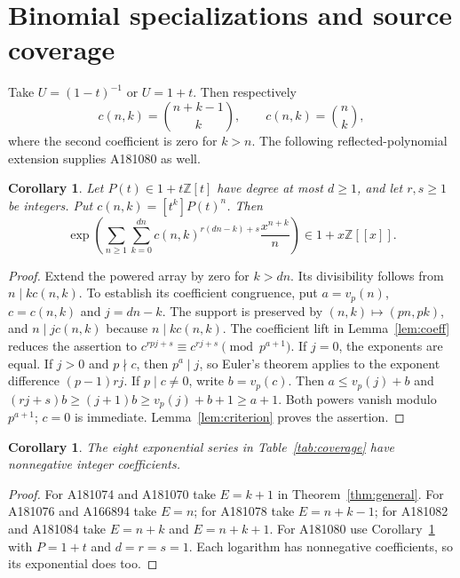 \documentclass[11pt]{article}
\newtheorem{corollary}[theorem]{Corollary}
\begin{document}
\section{Binomial specializations and source coverage}

Take \(U=(1-t)^{-1}\) or \(U=1+t\). Then respectively
\[
 c(n,k)=\binom{n+k-1}{k},\qquad c(n,k)=\binom nk,
\]
where the second coefficient is zero for \(k>n\).
The following reflected-polynomial extension supplies A181080 as well.

\begin{corollary}\label{cor:polynomial}
Let $P(t)\in1+t\mathbb Z[t]$ have degree at most $d\ge1$, and let
$r,s\ge1$ be integers. Put $c(n,k)=[t^k]P(t)^n$. Then
\[
 \exp\left(\sum_{n\ge1}\sum_{k=0}^{dn}
 c(n,k)^{r(dn-k)+s}\frac{x^{n+k}}n\right)\in1+x\mathbb Z[[x]].
\]
\end{corollary}
\begin{proof}
Extend the powered array by zero for $k>dn$. Its divisibility follows
from $n\mid kc(n,k)$. To establish its coefficient congruence, put
$a=v_p(n)$, $c=c(n,k)$ and $j=dn-k$. The support is preserved by $(n,k)\mapsto(pn,pk)$,
and $n\mid jc(n,k)$ because $n\mid kc(n,k)$.
The coefficient lift in Lemma~\ref{lem:coeff} reduces the assertion to
$c^{rpj+s}\equiv c^{rj+s}\pmod{p^{a+1}}$.
If $j=0$, the exponents are equal. If $j>0$ and $p\nmid c$,
then $p^a\mid j$, so Euler's theorem applies to the exponent difference
$(p-1)rj$. If $p\mid c\ne0$, write $b=v_p(c)$.
Then $a\le v_p(j)+b$ and
$(rj+s)b\ge(j+1)b\ge v_p(j)+b+1\ge a+1$.
Both powers vanish modulo $p^{a+1}$; $c=0$ is immediate.
Lemma~\ref{lem:criterion} proves the assertion.
\end{proof}

\begin{corollary}\label{cor:binomial}
The eight exponential series in Table~\ref{tab:coverage} have nonnegative
integer coefficients.
\end{corollary}
\begin{proof}
For A181074 and A181070 take $E=k+1$ in Theorem~\ref{thm:general}.
For A181076 and A166894 take $E=n$; for A181078 take $E=n+k-1$;
for A181082 and A181084 take $E=n+k$ and $E=n+k+1$.
For A181080 use Corollary~\ref{cor:polynomial} with $P=1+t$ and
$d=r=s=1$. Each logarithm has nonnegative coefficients, so its
exponential does too.
\end{proof}
\end{document}
